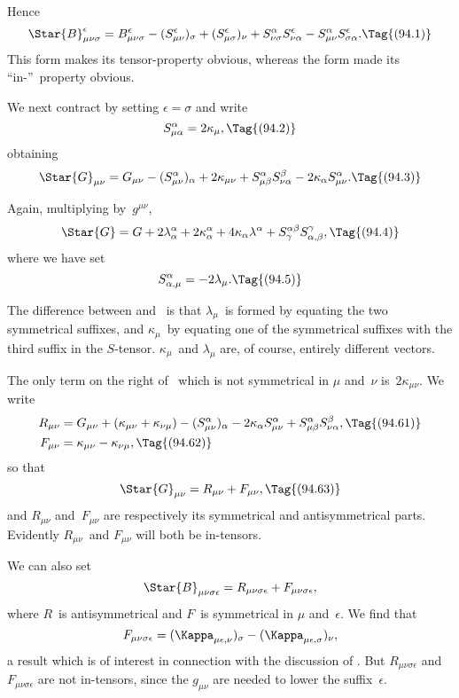 \documentclass[12pt]{book}
\begin{document}
Hence
\[
\Star{B}_{\mu\nu\sigma}^{\epsilon}
= B_{\mu\nu\sigma}^{\epsilon} - (S_{\mu\nu}^{\epsilon})_{\sigma} + (S_{\mu\sigma}^{\epsilon})_{\nu}
+ S_{\nu\sigma}^{\alpha} S_{\nu\alpha}^{\epsilon} - S_{\mu\nu}^{\alpha} S_{\sigma\alpha}^{\epsilon}.
\Tag{(94.1)}
\]
This form makes its tensor\hyp{}property obvious, whereas the form  made its ``in-''~property obvious.

We next contract by setting $\epsilon = \sigma$ and write
\[
S_{\mu\alpha}^{\alpha} = 2\kappa_{\mu},
\Tag{(94.2)}
\]
obtaining
\[
\Star{G}_{\mu\nu} = G_{\mu\nu} - (S_{\mu\nu}^{\alpha})_{\alpha}
+ 2\kappa_{\mu\nu} + S_{\mu\beta}^{\alpha} S_{\nu\alpha}^{\beta}
- 2\kappa_{\alpha} S_{\mu\nu}^{\alpha}.
\Tag{(94.3)}
\]

Again, multiplying by~$g^{\mu\nu}$,
\[
\Star{G} = G + 2\lambda_{\alpha}^{\alpha} + 2\kappa_{\alpha}^{\alpha}
+ 4\kappa_{\alpha} \lambda^{\alpha} + S_{\gamma}^{\alpha\beta} S_{\alpha,\beta}^{\gamma},
\Tag{(94.4)}
\]
where we have set
\[
S_{\alpha,\mu}^{\alpha} = -2\lambda_{\mu}.
\Tag{(94.5)}
\]

The difference between  and~ is that $\lambda_{\mu}$~is formed by equating
the two symmetrical suffixes, and $\kappa_{\mu}$~by equating one of the symmetrical
suffixes with the third suffix in the $S$-tensor. $\kappa_{\mu}$~and $\lambda_{\mu}$ are, of course, entirely
different vectors.

The only term on the right of~ which is not symmetrical in $\mu$ and~$\nu$
is~$2\kappa_{\mu\nu}$. We write
\begin{align*}
  R_{\mu\nu} &= G_{\mu\nu} + (\kappa_{\mu\nu} + \kappa_{\nu\mu})
  - (S_{\mu\nu}^{\alpha})_{\alpha} - 2\kappa_{\alpha} S_{\mu\nu}^{\alpha}
  + S_{\mu\beta}^{\alpha} S_{\nu\alpha}^{\beta},
  \Tag{(94.61)} \\
  F_{\mu\nu} &= \kappa_{\mu\nu} - \kappa_{\nu\mu},
  \Tag{(94.62)}
\end{align*}
so that
\[
\Star{G}_{\mu\nu} = R_{\mu\nu} + F_{\mu\nu},
\Tag{(94.63)}
\]
and $R_{\mu\nu}$ and~$F_{\mu\nu}$ are respectively its symmetrical and antisymmetrical parts.
Evidently $R_{\mu\nu}$~and $F_{\mu\nu}$ will both be in-tensors.

We can also set
\[
\Star{B}_{\mu\nu\sigma\epsilon} = R_{\mu\nu\sigma\epsilon} + F_{\mu\nu\sigma\epsilon},
\]
where $R$~is antisymmetrical and $F$~is symmetrical in $\mu$ and~$\epsilon$. We find that
%
\[
F_{\mu\nu\sigma\epsilon} = (\Kappa_{\mu\epsilon,\nu})_{\sigma} - (\Kappa_{\mu\epsilon,\sigma})_{\nu},
\]
a result which is of interest in connection with the discussion of . But
$R_{\mu\nu\sigma\epsilon}$ and $F_{\mu\nu\sigma\epsilon}$ are not in-tensors, since the $g_{\mu\nu}$ are needed to lower the suffix~$\epsilon$.
\end{document}
